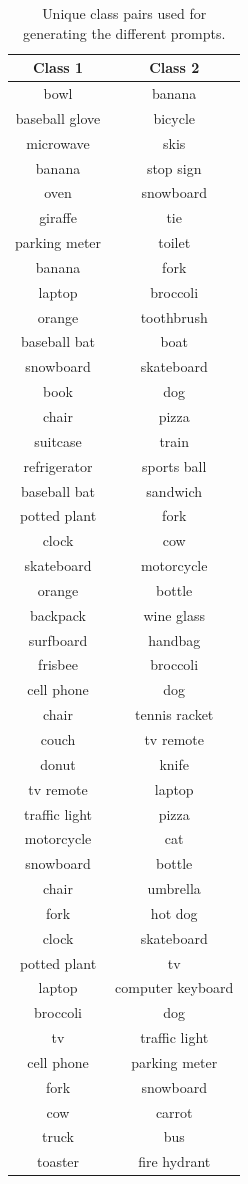 \begin{table}
\centering
\begin{tabular}{cc}
\toprule
Class 1 & Class 2 \\
\midrule
bowl & banana \\
baseball glove & bicycle \\
microwave & skis \\
banana & stop sign \\
oven & snowboard \\
giraffe & tie \\
parking meter & toilet \\
banana & fork \\
laptop & broccoli \\
orange & toothbrush \\
baseball bat & boat \\
snowboard & skateboard \\
book & dog \\
chair & pizza \\
suitcase & train \\
refrigerator & sports ball \\
baseball bat & sandwich \\
potted plant & fork \\
clock & cow \\
skateboard & motorcycle \\
orange & bottle \\
backpack & wine glass \\
surfboard & handbag \\
frisbee & broccoli \\
cell phone & dog \\
chair & tennis racket \\
couch & tv remote \\
donut & knife \\
tv remote & laptop \\
traffic light & pizza \\
motorcycle & cat \\
snowboard & bottle \\
chair & umbrella \\
fork & hot dog \\
clock & skateboard \\
potted plant & tv \\
laptop & computer keyboard \\
broccoli & dog \\
tv & traffic light \\
cell phone & parking meter \\
fork & snowboard \\
cow & carrot \\
truck & bus \\
toaster & fire hydrant \\
\bottomrule
\end{tabular}
\caption{Unique class pairs used for generating the different prompts.}
\label{tab:class_pairs_2}
\end{table}

